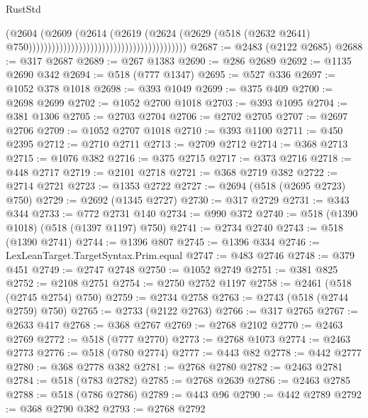 \begin{lexlean}{RustStd}
\begin{coremodule}
                                                                        (@2604
                                                                          (@2609
                                                                            (@2614
                                                                              (@2619
                                                                                (@2624
                                                                                  (@2629
                                                                                    (@518
                                                                                      (@2632 @2641)
                                                                                      @750)))))))))))))))))))))))))))))))))))))))))
@2687 := @2483 (@2122 @2685)
@2688 := @317 @2687
@2689 := @267 @1383
@2690 := @286 @2689
@2692 := @1135 @2690 @342
@2694 := @518 (@777 @1347)
@2695 := @527 @336
@2697 := @1052 @378 @1018
@2698 := @393 @1049
@2699 := @375 @409
@2700 := @2698 @2699
@2702 := @1052 @2700 @1018
@2703 := @393 @1095
@2704 := @381 @1306
@2705 := @2703 @2704
@2706 := @2702 @2705
@2707 := @2697 @2706
@2709 := @1052 @2707 @1018
@2710 := @393 @1100
@2711 := @450 @2395
@2712 := @2710 @2711
@2713 := @2709 @2712
@2714 := @368 @2713
@2715 := @1076 @382
@2716 := @375 @2715
@2717 := @373 @2716
@2718 := @448 @2717
@2719 := @2101 @2718
@2721 := @368 @2719 @382
@2722 := @2714 @2721
@2723 := @1353 @2722
@2727 := @2694 (@518 (@2695 @2723) @750)
@2729 := @2692 (@1345 @2727)
@2730 := @317 @2729
@2731 := @343 @344
@2733 := @772 @2731 @140
@2734 := @990 @372
@2740 := @518 (@1390 @1018) (@518 (@1397 @1197) @750)
@2741 := @2734 @2740
@2743 := @518 (@1390 @2741)
@2744 := @1396 @807
@2745 := @1396 @334
@2746 := LexLeanTarget.TargetSyntax.Prim.equal
@2747 := @483 @2746
@2748 := @379 @451
@2749 := @2747 @2748
@2750 := @1052 @2749
@2751 := @381 @825
@2752 := @2108 @2751
@2754 := @2750 @2752 @1197
@2758 := @2461 (@518 (@2745 @2754) @750)
@2759 := @2734 @2758
@2763 := @2743 (@518 (@2744 @2759) @750)
@2765 := @2733 (@2122 @2763)
@2766 := @317 @2765
@2767 := @2633 @417
@2768 := @368 @2767
@2769 := @2768 @2102
@2770 := @2463 @2769
@2772 := @518 (@777 @2770)
@2773 := @2768 @1073
@2774 := @2463 @2773
@2776 := @518 (@780 @2774)
@2777 := @443 @82
@2778 := @442 @2777
@2780 := @368 @2778 @382
@2781 := @2768 @2780
@2782 := @2463 @2781
@2784 := @518 (@783 @2782)
@2785 := @2768 @2639
@2786 := @2463 @2785
@2788 := @518 (@786 @2786)
@2789 := @443 @96
@2790 := @442 @2789
@2792 := @368 @2790 @382
@2793 := @2768 @2792

\end{coremodule}
\end{lexlean}
